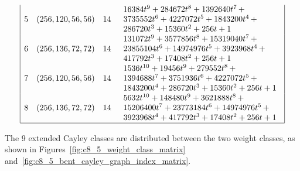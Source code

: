 \begin{table}[!bhpt]
\begin{align*}
\begin{array}{|cccl|}
5 &
(256, 120, 56, 56) &
14 &
\begin{array}{l}
16384t^{9} + 284672t^{8} + 1392640t^{7}
\,+
\\
 3735552t^{6} + 4227072t^{5} + 1843200t^{4}
\,+
\\
 286720t^{3} + 15360t^{2} + 256t + 1
\end{array}
\\
6 &
(256, 136, 72, 72) &
14 &
\begin{array}{l}
131072t^{9} + 3577856t^{8} + 15319040t^{7}
\,+
\\
 23855104t^{6} + 14974976t^{5} + 3923968t^{4}
\,+
\\
 417792t^{3} + 17408t^{2} + 256t + 1
\end{array}
\\
7 &
(256, 120, 56, 56) &
14 &
\begin{array}{l}
1536t^{10} + 19456t^{9} + 279552t^{8}
\,+
\\
 1394688t^{7} + 3751936t^{6} + 4227072t^{5}
\,+
\\
 1843200t^{4} + 286720t^{3} + 15360t^{2} + 256t + 1
\end{array}
\\
8 &
(256, 136, 72, 72) &
14 &
\begin{array}{l}
5632t^{10} + 148480t^{9} + 3621888t^{8}
\,+
\\
 15206400t^{7} + 23773184t^{6} + 14974976t^{5}
\,+
\\
 3923968t^{4} + 417792t^{3} + 17408t^{2} + 256t + 1
\end{array}
\\
\hline
\end{array}
\end{align*}
\caption{$[f_{8,5}]$ extended Cayley classes.}
\label{tab-c8_5_EC_classes}
\end{table}
\newpage
The 9 extended Cayley classes are distributed between the two weight classes,
as shown in Figures~\ref{fig:c8_5_weight_class_matrix} and~\ref{fig:c8_5_bent_cayley_graph_index_matrix}.

